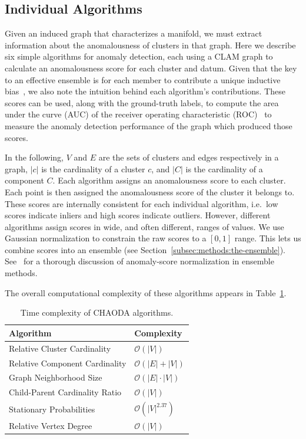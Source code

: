 \subsection{Individual Algorithms}
\label{subsec:methods:individual-algorithms}

Given an induced graph that characterizes a manifold, we must extract information about the anomalousness of clusters in that graph.
Here we describe six simple algorithms for anomaly detection, each using a CLAM graph to calculate an anomalousness score for each cluster and datum.
Given that the key to an effective ensemble is for each member to contribute a unique inductive bias~\cite{chen2017outlier}, we also note the intuition behind each algorithm's contributions.
These scores can be used, along with the ground-truth labels, to compute the area under the curve (AUC) of the receiver operating characteristic (ROC)~\cite{fawcett2006introduction} to measure the anomaly detection performance of the graph which produced those scores.

In the following,
$V$ and $E$ are the sets of clusters and edges respectively in a graph,
$|c|$ is the cardinality of a cluster $c$,
and $|C|$ is the cardinality of a component $C$.
Each algorithm assigns an anomalousness score to each cluster.
Each point is then assigned the anomalousness score of the cluster it belongs to.
These scores are internally consistent for each individual algorithm, i.e.\ low scores indicate inliers and high scores indicate outliers.
However, different algorithms assign scores in wide, and often different, ranges of values.
We use Gaussian normalization to constrain the raw scores to a $[0, 1]$ range.
This lets us combine scores into an ensemble (see Section~\ref{subsec:methods:the-ensemble}).
See~\cite{kriegel2011interpreting} for a thorough discussion of anomaly-score normalization in ensemble methods.

The overall computational complexity of these algorithms appears in Table~\ref{table:methods:complexity}.

\begin{table}[ht!]
\centering
\caption{Time complexity of CHAODA algorithms.}
\label{table:methods:complexity}
\begin{tabular}{|l|l|}
\hline
\textbf{Algorithm} & \textbf{Complexity} \\
\hline
 Relative Cluster Cardinality & $\mathcal{O}(|V|)$ \\
 \hline
 Relative Component Cardinality & $\mathcal{O}(|E| + |V|)$  \\
 \hline
 Graph Neighborhood Size & $\mathcal{O}(|E| \cdot |V|)$  \\ 
 \hline
 Child-Parent Cardinality Ratio & $\mathcal{O}(|V|)$ \\ 
 \hline
 Stationary Probabilities & $\mathcal{O}(|V|^{2.37})$ \\ 
 \hline
 Relative Vertex Degree & $\mathcal{O}(|V|)$ \\
 \hline
\end{tabular}
\end{table}



